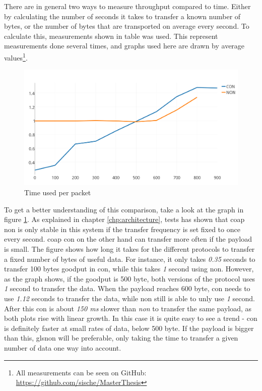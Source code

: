 There are in general two ways to measure throughput compared to time. Either by calculating the number of seconds it takes to transfer a known number of bytes, or the number of bytes that are transported on average every second. To calculate this, measurements shown in table  was used. This represent measurements done several times, and graphs used here are drawn by average values\footnote{All measurements can be seen on GitHub: \url{https://github.com/sische/MasterThesis}}. 

\begin{figure}[ht]
    \centering
    \includegraphics[scale=1.0]{timeUsedPRpacket.png}    
    \caption{Time used per packet}
    \label{fig:timeUsedPRpacket}
\end{figure}

To get a better understanding of this comparison, take a look at the graph in figure \ref{fig:timeUsedPRpacket}. As explained in chapter \ref{chp:architecture}, tests has shown that \gls{coap} \gls{non} is only stable in this system if the transfer frequency is set fixed to once every second. \gls{coap} \gls{con} on the other hand can transfer more often if the \gls{payload} is small. The figure shows how long it takes for the different protocols to transfer a fixed number of bytes of useful data. For instance, it only takes \textit{0.35} seconds to transfer 100 bytes goodput in \gls{con}, while this takes \textit{1} second using \gls{non}. However, as the graph shows, if the goodput is 500 byte, both versions of the protocol uses \textit{1} second to transfer the data. When the \gls{payload} reaches 600 byte, \gls{con} needs to use \textit{1.12} seconds to transfer the data, while \gls{non} still is able to unly use \textit{1} second. After this \gls{con} is about \textit{150 ms} slower than \textit{non} to transfer the same payload, as both plots rise with linear growth. In this case it is quite easy to see a trend - \gls{con} is definitely faster at small rates of data, below 500 byte. If the payload is bigger than this, gls{non} will be preferable, only taking the time to transfer a given number of data one way into account. 

